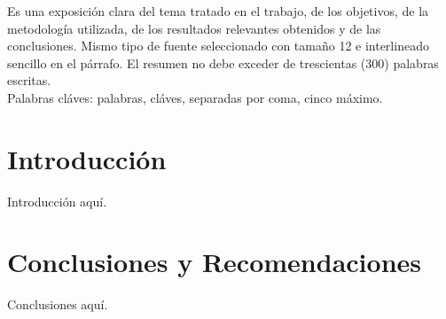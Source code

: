 \documentclass[pregrado]{tesis-usb}
\begin{document}
\frontmatter
\maketitle
\begin{resumen}
     Es una exposici\'on clara del tema tratado en el trabajo, de los objetivos, de la metodolog\'ia utilizada, de los resultados relevantes obtenidos y de las conclusiones. Mismo tipo de fuente seleccionado con tamaño 12 e interlineado sencillo en el p\'arrafo. El resumen no debe exceder de trescientas (300) palabras escritas. \\
     Palabras cl\'aves: palabras, cl\'aves, separadas por coma, cinco m\'aximo.
\end{resumen}
\tableofcontents

\mainmatter
\chapter*{Introducción}
\par Introducción aquí.





\chapter*{Conclusiones y Recomendaciones}
\par Conclusiones aquí.
\nocite{*}

\end{document}
